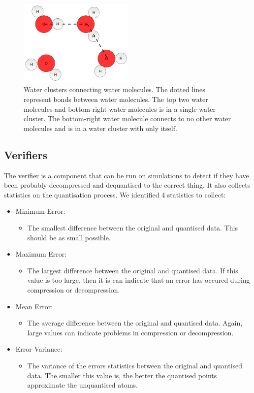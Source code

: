 \documentclass[a4paper,11pt]{report}
\begin{document}
\begin{figure}
 \center
 \includegraphics[width=0.5\textwidth]{resources/WaterClusters.png}
\caption{Water clusters connecting water molecules. The dotted lines represent bonds between water molecules. The top two water molecules and bottom-right water molecules is in a single water cluster. The bottom-right water molecule connects to no other water molecules and is in a water cluster with only itself. }
\label{WCDescrip}
\end{figure}

\subsection{Verifiers}

The verifier is a component that can be run on simulations to detect if they have been probably decompressed and dequantised to the correct thing. It also collects statistics on the quantisation process.
We identified 4 statistics to collect:
\begin{itemize}
 \item Minimum Error: 
 \begin{itemize}
   \item The smallest difference between the original and quantised data. This should be as small possible.
 \end{itemize}
 \item Maximum Error:
 \begin{itemize}
   \item The largest difference between the original and quantised data. If this value is too large, then it is can indicate that an error has occured during compression or decompression.
 \end{itemize}
 \item Mean Error:
 \begin{itemize}
   \item The average difference between the original and quantised data. Again, large values can indicate problems in compression or decompression.
 \end{itemize}
 \item Error Variance:
 \begin{itemize}
   \item The variance of the errors statistics between the original and quantised data. The smaller this value is, the better the quantised points approximate the unquantised atoms.
 \end{itemize}
\end{itemize}
\end{document}
